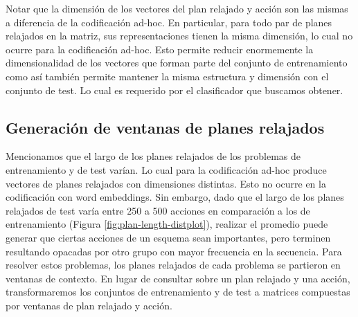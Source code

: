 \begin{table}[h!]
\centering
{}
 \caption{Planes relajados y acciones etiquetadas usando codificación por word embeddings.}
\end{table}

Notar que la dimensión de los vectores del plan relajado y acción son las mismas
a diferencia de la codificación ad-hoc. En particular, para todo par de planes
relajados en la matriz, sus representaciones tienen la misma dimensión, lo cual
no ocurre para la codificación ad-hoc. Esto permite reducir enormemente la
dimensionalidad de los vectores que forman parte del conjunto de entrenamiento
como así también permite mantener la misma estructura y dimensión con el
conjunto de test. Lo cual es requerido por el clasificador que buscamos obtener.

\subsection{Generación de ventanas de planes relajados}

Mencionamos que el largo de los planes relajados de los problemas de
entrenamiento y de test varían. Lo cual para la codificación ad-hoc produce
vectores de planes relajados con dimensiones distintas. Esto no ocurre en la
codificación con word embeddings. Sin embargo, dado que el largo de los planes
relajados de test varía entre 250 a 500 acciones en comparación a los de
entrenamiento (Figura \ref{fig:plan-length-distplot}), realizar el promedio
puede generar que ciertas acciones de un esquema sean importantes, pero terminen
resultando opacadas por otro grupo con mayor frecuencia en la secuencia. Para
resolver estos problemas, los planes relajados de cada problema se partieron en
ventanas de contexto. En lugar de consultar sobre un plan relajado y una acción,
transformaremos los conjuntos de entrenamiento y de test a matrices compuestas por
ventanas de plan relajado y acción.

